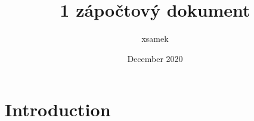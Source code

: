 \documentclass{article}
\title{1 zápočtový dokument}
\author{xsamek }
\date{December 2020}
\begin{document}
\maketitle

\section{Introduction}
\end{document}
